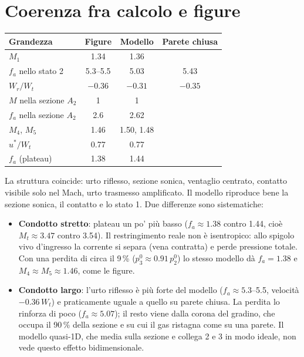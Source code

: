 \documentclass[11pt,a4paper]{article}
\newcommand{\fa}{f_a}
\begin{document}
\section{Coerenza fra calcolo e figure}\label{sec:coerenza}
\begin{table}[H]
  \centering
  \begin{tabular}{lccc}
    \toprule
    Grandezza & Figure & Modello & Parete chiusa \\
    \midrule
    $M_1$ & \num{1.34} & \num{1.36} & \\
    $\fa$ nello stato 2 & \num{5.3}--\num{5.5} & \num{5.03} & \num{5.43} \\
    $W_r/W_t$ & $-\num{0.36}$ & $-\num{0.31}$ & $-\num{0.35}$ \\
    $M$ nella sezione $A_2$ & 1 & 1 & \\
    $\fa$ nella sezione $A_2$ & \num{2.6} & \num{2.62} & \\
    $M_4$, $M_5$ & \num{1.46} & \num{1.50}, \num{1.48} & \\
    $u^*/W_t$ & \num{0.77} & \num{0.77} & \\
    $\fa$ (plateau) & \num{1.38} & \num{1.44} & \\
    \bottomrule
  \end{tabular}
\end{table}
La struttura coincide: urto riflesso, sezione sonica, ventaglio centrato, contatto visibile solo nel Mach,
urto trasmesso amplificato. Il modello riproduce bene la sezione sonica, il contatto e lo stato 1. Due
differenze sono sistematiche:
\begin{itemize}
  \item \textbf{Condotto stretto}: plateau un po' più basso ($\fa\approx\num{1.38}$ contro \num{1.44}, cioè
    $M_t\approx\num{3.47}$ contro \num{3.54}). Il restringimento reale non è isentropico: allo spigolo vivo
    d'ingresso la corrente si separa (vena contratta) e perde pressione totale. Con una perdita di circa il
    9\,\% ($p^0_3\approx\num{0.91}\,p^0_2$) lo stesso modello dà $\fa=\num{1.38}$ e $M_4\approx M_5\approx\num{1.46}$, come
    le figure.
  \item \textbf{Condotto largo}: l'urto riflesso è più forte del modello ($\fa\approx\num{5.3}$--\num{5.5}, velocità
    $-\num{0.36}\,W_t$) e praticamente uguale a quello su parete chiusa. La perdita lo rinforza di poco
    ($\fa\approx\num{5.07}$); il resto viene dalla corona del gradino, che occupa il 90\,\% della sezione e su cui
    il gas ristagna come su una parete. Il modello quasi-1D, che media sulla sezione e collega 2 e 3 in modo
    ideale, non vede questo effetto bidimensionale.
\end{itemize}
\end{document}
